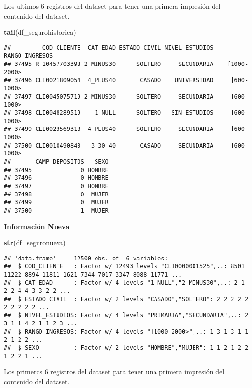 \documentclass[]{article}
\newenvironment{Shaded}{\begin{snugshade}}{\end{snugshade}}
\newcommand{\KeywordTok}[1]{\textcolor[rgb]{0.13,0.29,0.53}{\textbf{#1}}}
\newcommand{\NormalTok}[1]{#1}
\begin{document}
Los ultimos 6 registros del dataset para tener una primera impresión del
contenido del dataset.

\begin{Shaded}
\begin{Highlighting}[]
\KeywordTok{tail}\NormalTok{(df_segurohistorica)}
\end{Highlighting}
\end{Shaded}

\begin{verbatim}
##         COD_CLIENTE  CAT_EDAD ESTADO_CIVIL NIVEL_ESTUDIOS RANGO_INGRESOS
## 37495 R_10457703398 2_MINUS30      SOLTERO     SECUNDARIA    [1000-2000>
## 37496 CLI0021809054  4_PLUS40       CASADO    UNIVERSIDAD     [600-1000>
## 37497 CLI0045075719 2_MINUS30      SOLTERO     SECUNDARIA     [600-1000>
## 37498 CLI0048289519    1_NULL      SOLTERO   SIN_ESTUDIOS     [600-1000>
## 37499 CLI0023569318  4_PLUS40      SOLTERO     SECUNDARIA     [600-1000>
## 37500 CLI0010490840   3_30_40       CASADO     SECUNDARIA     [600-1000>
##       CAMP_DEPOSITOS   SEXO
## 37495              0 HOMBRE
## 37496              0 HOMBRE
## 37497              0 HOMBRE
## 37498              0  MUJER
## 37499              0  MUJER
## 37500              1  MUJER
\end{verbatim}

\textbf{Información Nueva}

\begin{Shaded}
\begin{Highlighting}[]
\KeywordTok{str}\NormalTok{(df_seguronueva)}
\end{Highlighting}
\end{Shaded}

\begin{verbatim}
## 'data.frame':    12500 obs. of  6 variables:
##  $ COD_CLIENTE   : Factor w/ 12493 levels "CLI0000001525",..: 8501 11222 8894 11811 1621 7344 7017 3347 8088 11771 ...
##  $ CAT_EDAD      : Factor w/ 4 levels "1_NULL","2_MINUS30",..: 2 1 2 2 4 4 3 3 2 2 ...
##  $ ESTADO_CIVIL  : Factor w/ 2 levels "CASADO","SOLTERO": 2 2 2 2 2 2 2 2 2 2 ...
##  $ NIVEL_ESTUDIOS: Factor w/ 4 levels "PRIMARIA","SECUNDARIA",..: 2 3 1 1 4 2 1 1 2 3 ...
##  $ RANGO_INGRESOS: Factor w/ 4 levels "[1000-2000>",..: 1 3 1 3 1 1 2 1 2 2 ...
##  $ SEXO          : Factor w/ 2 levels "HOMBRE","MUJER": 1 1 2 1 2 2 1 2 2 1 ...
\end{verbatim}

Los primeros 6 registros del dataset para tener una primera impresión
del contenido del dataset.
\end{document}
